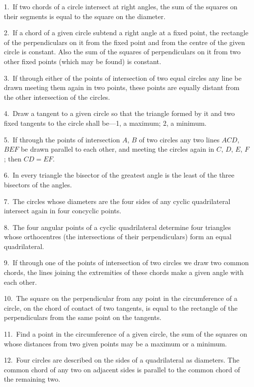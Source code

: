 \documentclass[oneside]{book}
\begin{document}
\begin{footnotesize}
1.~If two chords of a circle intersect at right angles, the sum
of the squares on their segments is equal to the square on the
diameter.

2.~If a chord of a given circle subtend a right angle at a fixed
point, the rectangle of the perpendiculars on it from the fixed
point and from the centre of the given circle is constant. Also
the sum of the squares of perpendiculars on it from two other
fixed points (which may be found) is constant.

3.~If through either of the points of intersection of two equal
circles any line be drawn meeting them again in two points,
these points are equally distant from the other intersection of the
circles.

4.~Draw a tangent to a given circle so that the triangle formed
by it and two fixed tangents to the circle shall be---1, a maximum;
2, a minimum.

5.~If through the points of intersection $A$, $B$ of two circles any
two lines $ACD$, $BEF$ be drawn parallel to each other, and meeting
the circles again in $C$, $D$, $E$, $F$; then $CD = EF$.

6.~In every triangle the bisector of the greatest angle is the
least of the three bisectors of the angles.

7.~The circles whose diameters are the four sides of any cyclic
quadrilateral intersect again in four concyclic points.

8.~The four angular points of a cyclic quadrilateral determine
four triangles whose orthocentres (the intersections of their perpendiculars)
form an equal quadrilateral.

9.~If through one of the points of intersection of two circles
we draw two common chords, the lines joining the extremities
of these chords make a given angle with each other.

10.~The square on the perpendicular from any point in the circumference
of a circle, on the chord of contact of two tangents, is
equal to the rectangle of the perpendiculars from the same point
on the tangents.

11.~Find a point in the circumference of a given circle, the
sum of the squares on whose distances from two given points may
be a maximum or a minimum.

12.~Four circles are described on the sides of a quadrilateral as
diameters. The common chord of any two on adjacent sides is
parallel to the common chord of the remaining two.


\end{footnotesize}
\end{document}
